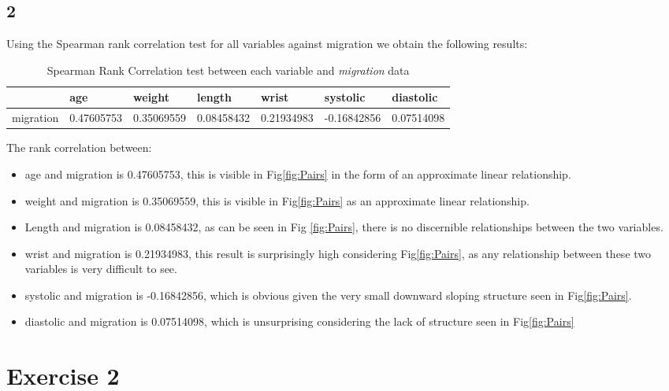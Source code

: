 \documentclass{article}
\begin{document}
    \subsection*{2}
    Using the Spearman rank correlation test for all variables against migration we obtain the following results:
	\begin{table}[H]
    \begin{center}
    \begin{tabular}{l|llllll}
        \hline 
        & age & weight & length & wrist & systolic & diastolic \\
        \hline
        migration &0.47605753 & 0.35069559 & 0.08458432 & 0.21934983 & -0.16842856 & 0.07514098 \\
        \hline
    \end{tabular}
    \caption{Spearman Rank Correlation test between each variable and \textit{migration} data}
    \label{table:rankcorr}
    \end{center}
    \end{table}
    
    
    The rank correlation between:
    \begin{itemize}
    \item age and migration is 0.47605753, this is visible in Fig\ref{fig:Pairs} in the form of an approximate linear relationship.
    \item weight and migration is 0.35069559, this is visible in Fig\ref{fig:Pairs} as an approximate linear relationship.
    \item Length and migration is 0.08458432, as can be seen in Fig \ref{fig:Pairs}, there is no discernible relationships between the two variables.
    \item wrist and migration is 0.21934983, this result is surprisingly high considering Fig\ref{fig:Pairs}, as any relationship between these two variables is very difficult to see.
    \item systolic and migration is -0.16842856, which is obvious given the very small downward sloping structure seen in Fig\ref{fig:Pairs}.
    \item diastolic and migration is 0.07514098, which is unsurprising considering the lack of structure seen in Fig\ref{fig:Pairs}
    \end{itemize}
    
    \section{Exercise 2}
\end{document}
